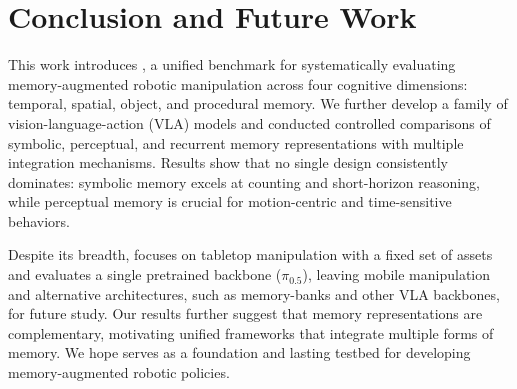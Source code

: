 \section{Conclusion and Future Work}
\label{sec:conclusion}

This work introduces \benchname, a unified benchmark for systematically evaluating memory-augmented robotic manipulation across four cognitive dimensions: temporal, spatial, object, and procedural memory. We further develop a family of vision-language-action (VLA) models and conducted controlled comparisons of symbolic, perceptual, and recurrent memory representations with multiple integration mechanisms. Results show that no single design consistently dominates: symbolic memory excels at counting and short-horizon reasoning, while perceptual memory is crucial for motion-centric and time-sensitive behaviors.


Despite its breadth, \benchname\xspace focuses on tabletop manipulation with a fixed set of assets and evaluates a single pretrained backbone ($\pi_{0.5}$), leaving mobile manipulation and alternative architectures, such as memory-banks and other VLA backbones, for future study. 
Our results further suggest that memory representations are complementary, motivating unified frameworks that integrate multiple forms of memory. We hope \benchname\xspace serves as a foundation and lasting testbed for developing memory-augmented robotic policies.

